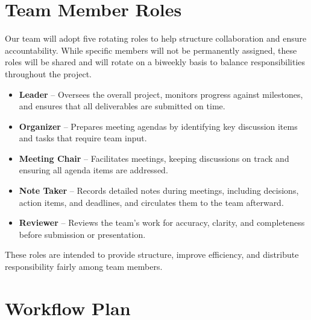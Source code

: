 \documentclass{article}
\begin{document}
\section{Team Member Roles}

Our team will adopt five rotating roles to help structure collaboration and ensure accountability.
While specific members will not be permanently assigned, these roles will be shared and will
rotate on a biweekly basis to balance responsibilities throughout the project.

\begin{itemize}
    \item \textbf{Leader} -- Oversees the overall project, monitors progress against milestones,
    and ensures that all deliverables are submitted on time.

    \item \textbf{Organizer} -- Prepares meeting agendas by identifying key discussion items
    and tasks that require team input.

    \item \textbf{Meeting Chair} -- Facilitates meetings, keeping discussions on track
    and ensuring all agenda items are addressed.

    \item \textbf{Note Taker} -- Records detailed notes during meetings, including decisions,
    action items, and deadlines, and circulates them to the team afterward.

    \item \textbf{Reviewer} -- Reviews the team’s work for accuracy, clarity, and completeness
    before submission or presentation.
\end{itemize}

These roles are intended to provide structure, improve efficiency,
and distribute responsibility fairly among team members.



\section{Workflow Plan}
\end{document}
